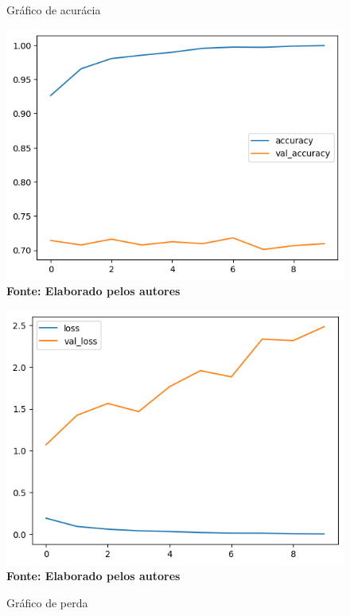 \begin{figure}[ht]
\centering
\begin{minipage}{0.45\textwidth}
  \centering
  \caption[\hspace{0.1cm}Grade Computacional.]{Gráfico de acurácia}
  \vspace{-0.4cm}
  \includegraphics[width=\linewidth]{figuras/accuracy_10.png}
  \captionsetup{justification=centering}
  \vspace{-0.2cm}
  \\\textbf{\footnotesize Fonte: Elaborado pelos autores}
  \label{fig:acc10}
\end{minipage}\hfill
\begin{minipage}{0.45\textwidth}
  \centering
  \caption[\hspace{0.1cm}Grade Computacional.]{Gráfico de perda}
  \vspace{-0.4cm}
  \includegraphics[width=\linewidth]{figuras/loss_10.png}
  \captionsetup{justification=centering}
  \vspace{-0.2cm}
  \\\textbf{\footnotesize Fonte: Elaborado pelos autores}
  \label{fig:loss10}
\end{minipage}
\end{figure}

